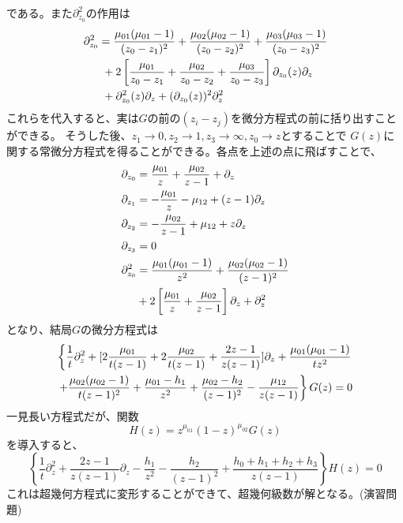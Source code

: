 \documentclass[11pt, aps, longbibliography]{article}
\numberwithin{equation}{section}
\begin{document}
        である。また$\partial_{z_0}^2$の作用は
        \begin{align}\label{eq:vec-eq3-5}
            \partial_{z_0}^2 &= \frac{\mu_{01}(\mu_{01}-1)}{(z_0-z_1)^2} + \frac{\mu_{02}(\mu_{02}-1)}{(z_0-z_2)^2} + \frac{\mu_{03}(\mu_{03}-1)}{(z_0-z_3)^2} \notag \\
            & \ + 2\left[ \frac{\mu_{01}}{z_0-z_1} + \frac{\mu_{02}}{z_0-z_2} + \frac{\mu_{03}}{z_0-z_3} \right] \partial_{z_0}(z)\partial_z \notag \\
            & \ + \partial_{z_0}^2(z)\partial_z + (\partial_{z_0}(z))^2\partial_z^2
        \end{align}
        これらを代入すると、実は$G$の前の$(z_i-z_j)$を微分方程式の前に括り出すことができる。
        そうした後、$z_1\rightarrow 0, z_2\rightarrow 1, z_3\rightarrow \infty, z_0\rightarrow z$とすることで
        $G(z)$に関する常微分方程式を得ることができる。各点を上述の点に飛ばすことで、
        \begin{align}\label{eq:vec-eq3-6}
            \partial_{z_0} &= \frac{\mu_{01}}{z} + \frac{\mu_{02}}{z-1} + \partial_z \notag \\
            \partial_{z_1} &= -\frac{\mu_{01}}{z} - \mu_{12} + (z-1)\partial_z \notag \\
            \partial_{z_2} &= -\frac{\mu_{02}}{z-1} + \mu_{12} + z\partial_z  \\
            \partial_{z_3} &= 0 \notag \\
            \partial_{z_0}^2 &= \frac{\mu_{01}(\mu_{01}-1)}{z^2} + \frac{\mu_{02}(\mu_{02}-1)}{(z-1)^2}  \notag \\
            &+ 2\left[ \frac{\mu_{01}}{z} + \frac{\mu_{02}}{z-1} \right]\partial_z + \partial_z^2 \notag 
        \end{align}
        となり、結局$G$の微分方程式は
        \begin{align}\label{eq:vec-eq3-7}
            \left\{ \frac{1}{t}\partial_z^2 + [2\frac{\mu_{01}}{t(z-1)} + 2\frac{\mu_{02}}{t(z-1)} + \frac{2z-1}{z(z-1)}]\partial_z + \frac{\mu_{01}(\mu_{01}-1)}{tz^2} \right. \notag \\
            \left. + \frac{\mu_{02}(\mu_{02}-1)}{t(z-1)^2} + \frac{\mu_{01}-h_1}{z^2} + \frac{\mu_{02}-h_2}{(z-1)^2}-  \frac{\mu_{12}}{z(z-1)}  \right\}G(z) = 0
        \end{align}
        一見長い方程式だが、関数
        \begin{equation}\label{eq:vec-eq3-8}
            H(z) = z^{\mu_{01}}(1-z)^{\mu_{02}}G(z)
        \end{equation}
        を導入すると、
        \begin{equation}\label{eq:vec-eq3-9}
            \left\{ \frac{1}{t}\partial_z^2 + \frac{2z-1}{z(z-1)}\partial_z - \frac{h_1}{z^2} - \frac{h_2}{(z-1)^2} + \frac{h_0 + h_1 + h_2 + h_3}{z(z-1)} \right\}H(z) = 0
        \end{equation}
        これは超幾何方程式に変形することができて、超幾何級数が解となる。(演習問題)
\end{document}
